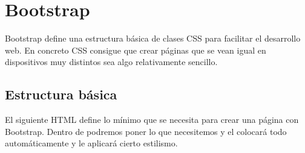 \documentclass[letterpaper,10pt,spanish]{sphinxmanual}
\begin{document}
\section{Bootstrap}
\label{\detokenize{tema3:bootstrap}}
Bootstrap define una estructura básica de clases CSS para facilitar el desarrollo web. En concreto CSS consigue que crear páginas que se vean igual en dispositivos muy distintos sea algo relativamente sencillo.


\subsection{Estructura básica}
\label{\detokenize{tema3:estructura-basica}}
El siguiente HTML define lo mínimo que se necesita para crear una página con Bootstrap. Dentro de  podremos poner lo que necesitemos y el  colocará todo automáticamente y le aplicará cierto estilismo.
\end{document}

